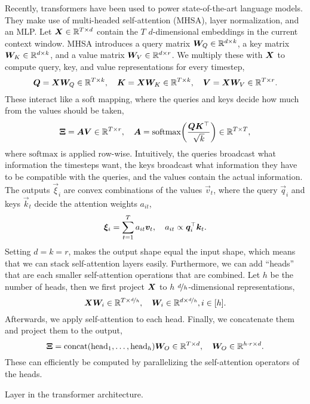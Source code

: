 Recently, transformers have been used to power state-of-the-art language models. They make use of
multi-headed self-attention (MHSA), layer normalization, and an MLP. Let $\bm{X} \in \mathbb{R}^{T \times
        d}$ contain the $T$ $d$-dimensional embeddings in the current context window. MHSA introduces a
query matrix $\bm{W}_Q \in \mathbb{R}^{d \times k}$, a key matrix $\bm{W}_K \in \mathbb{R}^{d \times k}$, and a
value matrix $\bm{W}_V \in \mathbb{R}^{d \times r}$. We multiply these with $\bm{X}$ to compute query,
key, and value representations for every timestep, \[
    \bm{Q} = \bm{X} \bm{W}_Q \in \mathbb{R}^{T\times k}, \quad \bm{K} = \bm{X} \bm{W}_K \in \mathbb{R}^{T\times k}, \quad \bm{V} = \bm{X} \bm{W}_V \in \mathbb{R}^{T\times r}.
\]
These interact like a soft mapping, where the queries and keys decide how much from the values
should be taken, \[
    \mat{\Xi} = \mat{A} \mat{V} \in \R^{T \times r}, \quad \mat{A} = \mathrm{softmax}\lft( \frac{\mat{Q} \transpose{\mat{K}}}{\sqrt{k}} \rgt) \in \R^{T \times T},
\]
where $\mathrm{softmax}$ is applied row-wise. Intuitively, the queries broadcast what information
the timesteps want, the keys broadcast what information they have to be compatible with the
queries, and the values contain the actual information. The outputs $\vec{\xi}_i$ are convex
combinations of the values $\vec{v}_t$, where the query $\vec{q}_i$ and keys $\vec{k}_t$ decide the
attention weights $a_{it}$, \[
    \bm{\xi}_i = \sum_{t=1}^{T} a_{it} \bm{v}_t, \quad a_{it} \propto \bm{q}_i^\top \bm{k}_t.
\]
Setting $d = k = r$, makes the output shape equal the input shape, which means that we can stack
self-attention layers easily. Furthermore, we can add ``heads'' that are each smaller
self-attention operations that are combined. Let $h$ be the number of heads, then we first project
$\bm{X}$ to $h$ $\nicefrac{d}{h}$-dimensional representations, \[
    \bm{X} \bm{W}_i \in \mathbb{R}^{T \times \nicefrac{d}{h}}, \quad \bm{W}_i \in \mathbb{R}^{d \times \nicefrac{d}{h}}, i \in [h].
\]
Afterwards, we apply self-attention to each head. Finally, we concatenate them and project them to
the output, \[
    \bm{\Xi} = \mathrm{concat}(\mathrm{head}_1, \ldots, \mathrm{head}_h) \bm{W}_O \in \mathbb{R}^{T \times d}, \quad \bm{W}_O \in \mathbb{R}^{h\cdot r \times d}.
\]
These can efficiently be computed by parallelizing the self-attention operators of the heads.

\begin{marginfigure}
    \centering
    \caption{Layer in the transformer architecture.}
    \label{fig:transformer-layer}
\end{marginfigure}

